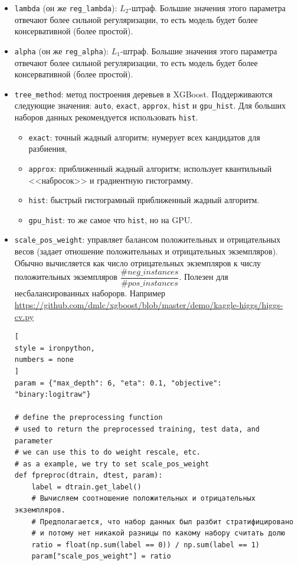 \documentclass[%
	11pt,
	a4paper,
	utf8,
		]{article}
\begin{document}
\begin{itemize}
	\item \verb|lambda| (он же \verb|reg_lambda|): $ L_2 $-штраф. Б\emph{о}льшие значения этого параметра отвечают более сильной регуляризации, то есть модель будет более консервативной (более простой).
	
	\item \verb|alpha| (он же \verb|reg_alpha|): $ L_1 $-штраф. Б\emph{о}льшие значения этого параметра отвечают более сильной регуляризации, то есть модель будет более консервативной (более простой).
	
	\item \verb|tree_method|: метод построения деревьев в XGBoost. Поддерживаются следующие значения: \verb|auto|, \verb|exact|, \verb|approx|, \verb|hist| и \verb|gpu_hist|. Для больших наборов данных рекомендуется использовать \verb|hist|.
\begin{itemize}
	\item \verb|exact|: точный жадный алгоритм; нумерует всех кандидатов для разбиения,
	
	\item \verb|approx|: приближенный жадный алгоритм; использует квантильный <<набросок>> и градиентную гистограмму.
	
	\item \verb|hist|: быстрый гистограмный приближенный жадный алгоритм.
	
	\item \verb|gpu_hist|: то же самое что \verb|hist|, но на GPU.
\end{itemize}

    \item \verb|scale_pos_weight|: управляет балансом положительных и отрицательных весов (задает отношение положительных и отрицательных экземпляров). Обычно вычисляется как число отрицательных экземпляров к числу положительных экземпляров $ \dfrac{\#neg\_instances}{\#pos\_instances} $. Полезен для несбалансированных наборорв. Например \url{https://github.com/dmlc/xgboost/blob/master/demo/kaggle-higgs/higgs-cv.py}
\begin{lstlisting}[
style = ironpython,
numbers = none
]
param = {"max_depth": 6, "eta": 0.1, "objective": "binary:logitraw"}

# define the preprocessing function
# used to return the preprocessed training, test data, and parameter
# we can use this to do weight rescale, etc.
# as a example, we try to set scale_pos_weight
def fpreproc(dtrain, dtest, param):
	label = dtrain.get_label()
	# Вычисляем соотношение положительных и отрицательных экземпляров.
	# Предполагается, что набор данных был разбит стратифицировано
	# и потому нет никакой разницы по какому набору считать долю
	ratio = float(np.sum(label == 0)) / np.sum(label == 1)
	param["scale_pos_weight"] = ratio
	

\end{lstlisting}
\end{itemize}
\end{document}
